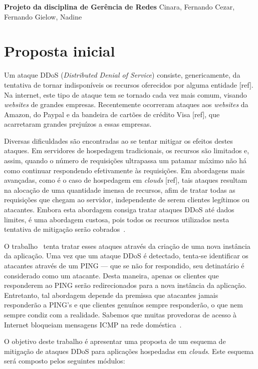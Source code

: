 \documentclass[a4paper, 11pt]{article}
\begin{document}
{
\begin{center}
{\LARGE \textbf{Projeto da disciplina de Gerência de Redes}}
\vskip 0.5cm
{\Large Cinara, Fernando Cezar, Fernando Gielow, Nadine}
\end{center}
}

\section{Proposta inicial}

Um ataque DDoS (\textit{Distributed Denial of Service}) consiste, genericamente, da tentativa de tornar indisponíveis os recursos oferecidos por alguma entidade [ref]. Na internet, este tipo de ataque tem se tornado cada vez mais comum, visando \emph{websites} de grandes empresas. Recentemente ocorreram ataques aos \emph{websites} da Amazon, do Paypal e da bandeira de cartões de crédito Visa [ref], que acarretaram grandes prejuízos a essas empresas.

Diversas dificuldades são encontradas ao se tentar mitigar os efeitos destes ataques. Em servidores de hospedagem tradicionais, os recursos são limitados e, assim, quando o número de requisições ultrapassa um patamar máximo não há como continuar respondendo efetivamente às requisições. Em abordagens mais avançadas, como é o caso de hospedagem em \emph{clouds} [ref], tais ataques resultam na alocação de uma quantidade imensa de recursos, afim de tratar todas as requisições que chegam ao servidor, independente de serem clientes legítimos ou atacantes. Embora esta abordagem consiga tratar ataques DDoS até dados limites, é uma abordagem custosa, pois todos os recursos utilizados nesta tentativa de mitigação serão cobrados~\cite{Khor:2009p24701}.

O trabalho~\cite{Bakshi:2010p24702} tenta tratar esses ataques através da criação de uma nova instância da aplicação. Uma vez que um ataque DDoS é detectado, tenta-se identificar os atacantes através de um PING --- que se não for respondido, seu detinatário é considerado como um atacante. Desta maneira, apenas os clientes que responderem ao PING serão redirecionados para a nova instância da aplicação. Entretanto, tal abordagem depende da premissa que atacantes jamais responderão a PING's e que clientes genuínos sempre responderão, o que nem sempre condiz com a realidade. Sabemos que muitas provedoras de acesso à Internet bloqueiam mensagens ICMP na rede doméstica~\cite{Kim}.

O objetivo deste trabalho é apresentar uma proposta de um esquema de mitigação de ataques DDoS para aplicações hospedadas em \emph{clouds}. Este esquema será composto pelos seguintes módulos:
\end{document}
